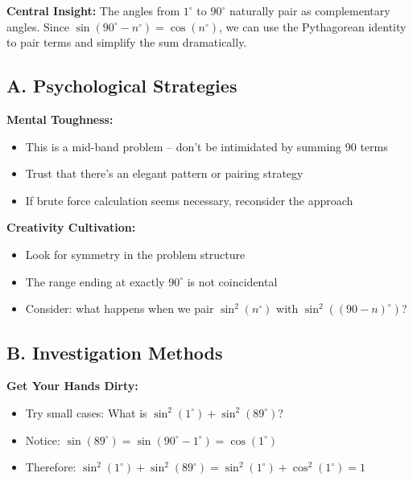 \documentclass[12pt]{article}
\begin{document}
\vspace{1em}

\begin{keyinsightbox}
\textbf{Central Insight:} The angles from $1^{\circ}$ to $90^{\circ}$ naturally pair as complementary angles. Since $\sin(90^{\circ} - n^{\circ}) = \cos(n^{\circ})$, we can use the Pythagorean identity to pair terms and simplify the sum dramatically.
\end{keyinsightbox}

\vspace{1em}

\begin{strategicbox}
\subsection*{A. Psychological Strategies}

\textbf{Mental Toughness:}
\begin{itemize}
    \item This is a mid-band problem -- don't be intimidated by summing 90 terms
    \item Trust that there's an elegant pattern or pairing strategy
    \item If brute force calculation seems necessary, reconsider the approach
\end{itemize}

\textbf{Creativity Cultivation:}
\begin{itemize}
    \item Look for symmetry in the problem structure
    \item The range ending at exactly $90^{\circ}$ is not coincidental
    \item Consider: what happens when we pair $\sin^2(n^{\circ})$ with $\sin^2((90-n)^{\circ})$?
\end{itemize}

\subsection*{B. Investigation Methods}

\textbf{Get Your Hands Dirty:}
\begin{itemize}
    \item Try small cases: What is $\sin^2(1^{\circ}) + \sin^2(89^{\circ})$?
    \item Notice: $\sin(89^{\circ}) = \sin(90^{\circ} - 1^{\circ}) = \cos(1^{\circ})$
    \item Therefore: $\sin^2(1^{\circ}) + \sin^2(89^{\circ}) = \sin^2(1^{\circ}) + \cos^2(1^{\circ}) = 1$
\end{itemize}


\end{strategicbox}
\end{document}
